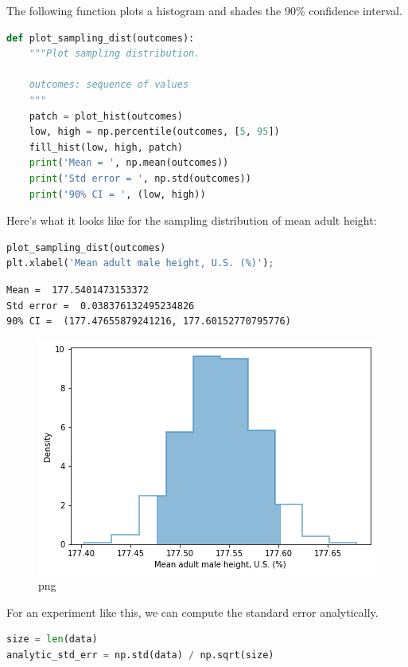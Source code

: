 The following function plots a histogram and shades the 90\% confidence
interval.

\begin{lstlisting}[language=Python]
def plot_sampling_dist(outcomes):
    """Plot sampling distribution.
    
    outcomes: sequence of values
    """
    patch = plot_hist(outcomes)
    low, high = np.percentile(outcomes, [5, 95])
    fill_hist(low, high, patch)
    print('Mean = ', np.mean(outcomes))
    print('Std error = ', np.std(outcomes))
    print('90% CI = ', (low, high))
\end{lstlisting}

Here's what it looks like for the sampling distribution of mean adult
height:

\begin{lstlisting}[language=Python]
plot_sampling_dist(outcomes)
plt.xlabel('Mean adult male height, U.S. (%)');
\end{lstlisting}

\begin{lstlisting}[]
Mean =  177.5401473153372
Std error =  0.038376132495234826
90% CI =  (177.47655879241216, 177.60152770795776)
\end{lstlisting}

\begin{figure}
\centering
\includegraphics{11_inference_files/11_inference_113_1.png}
\caption{png}
\end{figure}

For an experiment like this, we can compute the standard error
analytically.

\begin{lstlisting}[language=Python]
size = len(data)
analytic_std_err = np.std(data) / np.sqrt(size)
\end{lstlisting}


